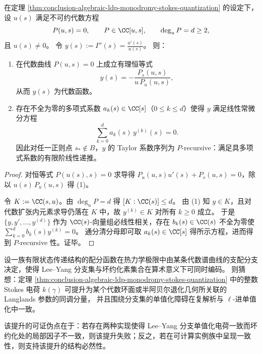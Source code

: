 \begin{proposition}[代数性强制的递归结构与高阶误差证书化]\label{prop:conclusion-algebraic-forces-precursive-error-control}
在定理 \ref{thm:conclusion-algebraic-ldp-monodromy-stokes-quantization} 的设定下，
设 \(u(s)\) 满足不可约代数方程
\[
P(u,s)=0,\qquad P\in\CC[u,s],\qquad \deg_u P=d\ge 2,
\]
且 \(u(s)\neq 0\)。
令
\(
y(s):=I''(s)=\frac{u'(s)}{u(s)}
\)。
则：
\begin{enumerate}
  \item 在代数曲线 \(P(u,s)=0\) 上成立有理恒等式
  \[
  y(s)=-\frac{P_s(u,s)}{u\,P_u(u,s)},
  \]
  从而 \(y(s)\) 为代数函数。
  \item 存在不全为零的多项式系数 \(a_k(s)\in\CC[s]\)（\(0\le k\le d\)）使得 \(y\) 满足线性常微分方程
  \[
  \sum_{k=0}^{d}a_k(s)\,y^{(k)}(s)=0.
  \]
  因此对任一正则点 \(s_\ast\notin B\)，\(y\) 的 Taylor 系数序列为 \(P\)-recursive：满足具多项式系数的有限阶线性递推。
\end{enumerate}
\end{proposition}
\begin{proof}
对恒等式 \(P(u(s),s)=0\) 求导得 \(P_u(u,s)u'(s)+P_s(u,s)=0\)，除以 \(u(s)\,P_u(u,s)\) 得 (1)。
\par
令 \(K:=\CC(s,u)\)。由 \(\deg_u P=d\) 得 \([K:\CC(s)]\le d\)。
由 (1) 知 \(y\in K\)，且对代数扩张内元素求导仍落在 \(K\) 中，故 \(y^{(k)}\in K\) 对所有 \(k\ge 0\) 成立。
于是 \(\{y,y',\dots,y^{(d)}\}\) 作为 \(\CC(s)\)-向量组必线性相关，存在 \(b_k(s)\in\CC(s)\) 不全为零使
\(\sum_{k=0}^{d}b_k(s)y^{(k)}=0\)。
通分清分母即可取 \(a_k(s)\in\CC[s]\) 得所示方程，进而得到 \(P\)-recursive 性。证毕。
\end{proof}

\begin{conjecture}\label{conj:conclusion-stokes-leyang-charge-langlands}
设一族有限状态传递结构的配分函数在热力学极限中由某条代数谱曲线的支配分支决定，使得 Lee--Yang 分支集与坏约化素集合在算术意义下可同时编码。
则猜想：定理 \ref{thm:conclusion-algebraic-ldp-monodromy-stokes-quantization} 中的整数 Stokes 电荷 \(k(\gamma)\) 可提升为某个代数环面或半阿贝尔退化几何所关联的 Langlands 参数的同调分量，
并且围绕分支集的单值化障碍在复解析与 \(\ell\)-进单值化中一致。
\par
该提升的可证伪点在于：若存在两种实现使得 Lee--Yang 分支单值化电荷一致而坏约化处的局部因子不一致，则该提升失败；反之，若在可计算实例族中呈现一致性，则支持该提升的结构必然性。
\end{conjecture}

\endinput

